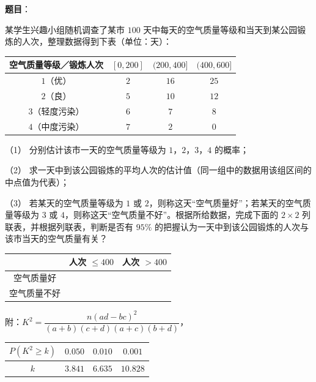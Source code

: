 \begin{answer}

\textbf{题目}：

某学生兴趣小组随机调查了某市 $100$ 天中每天的空气质量等级和当天到某公园锻炼的人次，整理数据得到下表（单位：天）：

\begin{center}
\begin{tabular}{cccc}
\toprule
空气质量等级／锻炼人次 & $[0,200]$ & $(200,400]$ & $(400,600]$ \\
\midrule
$1$（优） & $2$ & $16$ & $25$ \\
$2$（良） & $5$ & $10$ & $12$ \\
$3$（轻度污染） & $6$ & $7$ & $8$ \\
$4$（中度污染） & $7$ & $2$ & $0$ \\
\bottomrule
\end{tabular}
\end{center}

（1） 分别估计该市一天的空气质量等级为 $1$，$2$，$3$，$4$ 的概率；

（2） 求一天中到该公园锻炼的平均人次的估计值（同一组中的数据用该组区间的中点值为代表）；

（3） 若某天的空气质量等级为 $1$ 或 $2$，则称这天“空气质量好”；若某天的空气质量等级为 $3$ 或 $4$，则称这天“空气质量不好”。根据所给数据，完成下面的 $2\times2$ 列联表，并根据列联表，判断是否有 $95\%$ 的把握认为一天中到该公园锻炼的人次与该市当天的空气质量有关？

\begin{center}
\begin{tabular}{ccc}
\toprule
 & 人次 $\leqslant400$ & 人次 $>400$ \\
\midrule
空气质量好 &  &  \\
空气质量不好 &  &  \\
\bottomrule
\end{tabular}
\end{center}

附：$K^2=\dfrac{n(ad-bc)^2}{(a+b)(c+d)(a+c)(b+d)}$，

\begin{center}
\begin{tabular}{cccc}
\toprule
$P(K^2\geqslant k)$ & $0.050$ & $0.010$ & $0.001$ \\
\midrule
$k$ & $3.841$ & $6.635$ & $10.828$ \\
\bottomrule
\end{tabular}
\end{center}


\end{answer}

